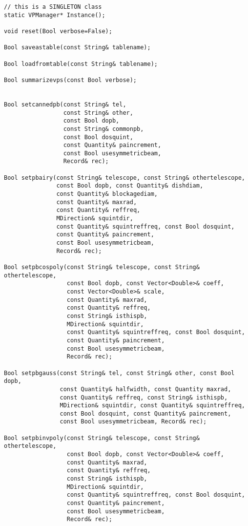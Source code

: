 \documentclass[12pt]{article}
\begin{document}
{\small
\begin{verbatim}
// this is a SINGLETON class
static VPManager* Instance();

void reset(Bool verbose=False);
 
Bool saveastable(const String& tablename);

Bool loadfromtable(const String& tablename);

Bool summarizevps(const Bool verbose);


Bool setcannedpb(const String& tel, 
                 const String& other, 
                 const Bool dopb,
                 const String& commonpb,
                 const Bool dosquint, 
                 const Quantity& paincrement, 
                 const Bool usesymmetricbeam,
                 Record& rec);

Bool setpbairy(const String& telescope, const String& othertelescope, 
               const Bool dopb, const Quantity& dishdiam, 
               const Quantity& blockagediam, 
               const Quantity& maxrad, 
               const Quantity& reffreq, 
               MDirection& squintdir, 
               const Quantity& squintreffreq, const Bool dosquint, 
               const Quantity& paincrement, 
               const Bool usesymmetricbeam,
               Record& rec);

Bool setpbcospoly(const String& telescope, const String& othertelescope,
                  const Bool dopb, const Vector<Double>& coeff,
                  const Vector<Double>& scale,
                  const Quantity& maxrad,
                  const Quantity& reffreq,
                  const String& isthispb,
                  MDirection& squintdir,
                  const Quantity& squintreffreq, const Bool dosquint,
                  const Quantity& paincrement,
                  const Bool usesymmetricbeam,
                  Record& rec);

Bool setpbgauss(const String& tel, const String& other, const Bool dopb,
                const Quantity& halfwidth, const Quantity maxrad, 
                const Quantity& reffreq, const String& isthispb, 
                MDirection& squintdir, const Quantity& squintreffreq,
                const Bool dosquint, const Quantity& paincrement, 
                const Bool usesymmetricbeam, Record& rec);

Bool setpbinvpoly(const String& telescope, const String& othertelescope,
                  const Bool dopb, const Vector<Double>& coeff,
                  const Quantity& maxrad,
                  const Quantity& reffreq,
                  const String& isthispb,
                  MDirection& squintdir,
                  const Quantity& squintreffreq, const Bool dosquint,
                  const Quantity& paincrement,
                  const Bool usesymmetricbeam,
                  Record& rec);
\end{verbatim}

}
\end{document}
